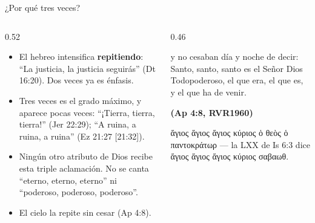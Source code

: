 \documentclass[hyperref={bookmarks=false},aspectratio=169]{beamer}
\newcommand{\grc}[1]{\foreignlanguage{ancientgreek}{#1}}
\newcommand{\fuente}[1]{\par\hfill{\upshape\bfseries\footnotesize\textcolor{azul}{#1}}}
\newcommand{\destacar}[1]{\textbf{\textcolor{azul}{#1}}}
\begin{document}
\begin{frame}{¿Por qué tres veces?}
\begin{columns}[t,onlytextwidth]
\begin{column}{0.52\textwidth}\small
\begin{itemize}
\item El hebreo intensifica \destacar{repitiendo}: ``La justicia, la justicia seguirás'' (Dt 16:20). Dos veces ya es énfasis.
\item Tres veces es el grado máximo, y aparece pocas veces: ``¡Tierra, tierra, tierra!'' (Jer 22:29); ``A ruina, a ruina, a ruina'' (Ez 21:27 [21:32]).
\item Ningún otro atributo de Dios recibe esta triple aclamación. No se canta ``eterno, eterno, eterno'' ni ``poderoso, poderoso, poderoso''.
\item El cielo la repite sin cesar (Ap 4:8).
\end{itemize}
\end{column}
\begin{column}{0.46\textwidth}
\begin{cita}y no cesaban día y noche de decir: Santo, santo, santo es el Señor Dios Todopoderoso, el que era, el que es, y el que ha de venir.\fuente{(Ap 4:8, RVR1960)}\end{cita}
\scriptsize\grc{ἅγιος ἅγιος ἅγιος κύριος ὁ θεὸς ὁ παντοκράτωρ} --- la LXX de Is 6:3 dice \grc{ἅγιος ἅγιος ἅγιος κύριος σαβαωθ}.
\end{column}
\end{columns}
\end{frame}
\end{document}
